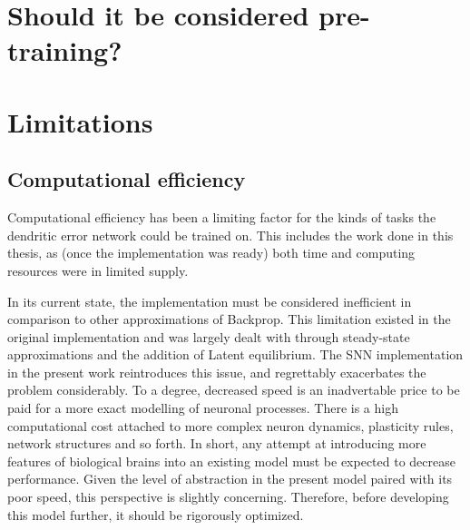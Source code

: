 \section{Should it be considered pre-training?}






\section{Limitations}


\subsection{Computational efficiency}

Computational efficiency has been a limiting factor for the kinds of tasks the dendritic error network
could be trained on. This includes the work done in this thesis, as (once the implementation was ready) both time and
computing resources were in limited supply.

In its current state, the implementation must be considered inefficient in comparison to other approximations of
Backprop. This limitation existed in the original implementation and was largely dealt with through steady-state
approximations and the addition of Latent equilibrium. The SNN implementation in the present work reintroduces this
issue, and regrettably exacerbates the problem considerably. To a degree, decreased speed is an inadvertable price to be
paid for a more exact modelling of neuronal processes. There is a high computational cost attached to more complex
neuron dynamics, plasticity rules, network structures and so forth. In short, any attempt at introducing more features
of biological brains into an existing model must be expected to decrease performance. Given the level of
abstraction in the present model paired with its poor speed, this perspective is slightly concerning. Therefore, before
developing this model further, it should be rigorously optimized.

